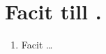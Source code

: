 \documentclass[11pt]{article}
\begin{document}
\raggedright

\section*{Facit till \lessonNumber. \lessonName}
\begin{enumerate}[itemsep=2em]
        \item
              Facit \ldots
\end{enumerate}
\vfill
\begin{center}
\end{center}
\end{document}
